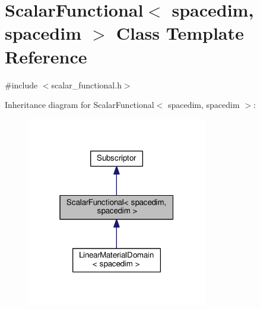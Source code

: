 \hypertarget{class_scalar_functional_3_01spacedim_00_01spacedim_01_4}{}\section{Scalar\+Functional$<$ spacedim, spacedim $>$ Class Template Reference}
\label{class_scalar_functional_3_01spacedim_00_01spacedim_01_4}


{\ttfamily \#include $<$scalar\+\_\+functional.\+h$>$}



Inheritance diagram for Scalar\+Functional$<$ spacedim, spacedim $>$\+:
\nopagebreak
\begin{figure}[H]
\begin{center}
\leavevmode
\includegraphics[width=223pt]{class_scalar_functional_3_01spacedim_00_01spacedim_01_4__inherit__graph}
\end{center}
\end{figure}


